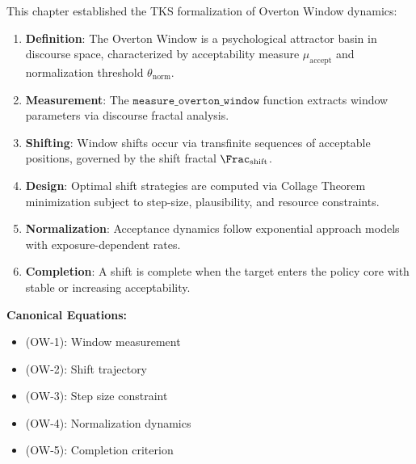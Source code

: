 \begin{tcolorbox}[colback=blue!5!white,colframe=blue!75!black,title=\textbf{Key Results},breakable]

This chapter established the TKS formalization of Overton Window dynamics:

\begin{enumerate}
    \item \textbf{Definition}: The Overton Window is a psychological attractor basin
          in discourse space, characterized by acceptability measure $\mu_{\mathrm{accept}}$
          and normalization threshold $\theta_{\mathrm{norm}}$.

    \item \textbf{Measurement}: The $\mathtt{measure\_overton\_window}$ function
          extracts window parameters via discourse fractal analysis.

    \item \textbf{Shifting}: Window shifts occur via transfinite sequences of
          acceptable positions, governed by the shift fractal $\Frac_{\mathrm{shift}}$.

    \item \textbf{Design}: Optimal shift strategies are computed via Collage Theorem
          minimization subject to step-size, plausibility, and resource constraints.

    \item \textbf{Normalization}: Acceptance dynamics follow exponential approach
          models with exposure-dependent rates.

    \item \textbf{Completion}: A shift is complete when the target enters the
          policy core with stable or increasing acceptability.
\end{enumerate}

\textbf{Canonical Equations:}
\begin{itemize}
    \item (OW-1): Window measurement
    \item (OW-2): Shift trajectory
    \item (OW-3): Step size constraint
    \item (OW-4): Normalization dynamics
    \item (OW-5): Completion criterion
\end{itemize}

\end{tcolorbox}

